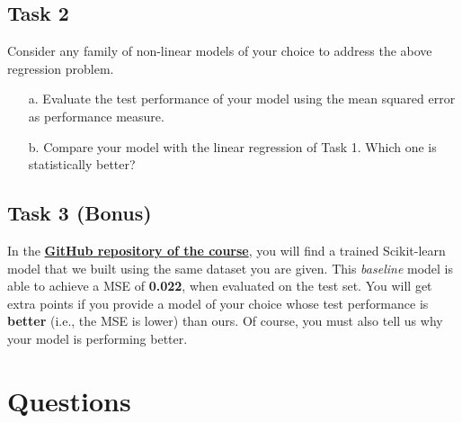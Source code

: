 \documentclass[11pt]{scrartcl}
\begin{document}
\subsection*{Task 2}
Consider any family of non-linear models of your choice to address the above regression problem.
\begin{itemize}
	\item [a.] Evaluate the test performance of your model using the mean squared error as performance measure. 
	\item [b.] Compare your model with the linear regression of Task 1. Which one is {statistically} better?
\end{itemize}

\subsection*{Task 3 (Bonus)}
In the \href{https://github.com/GiorgiaAuroraAdorni/ML-bachelor-course-assignments-sp23}{\textbf{GitHub repository of the course}}, you will find a trained Scikit-learn model that we built using the same dataset you are given. 
This \textit{baseline} model is able to achieve a MSE of \textbf{0.022}, when evaluated on the test set. 
You will get extra points if you provide a model of your choice whose test performance is \textbf{better} (i.e., the MSE is lower) than ours. Of course, you must also tell us why your model is performing better.

\section*{Questions}
\end{document}
